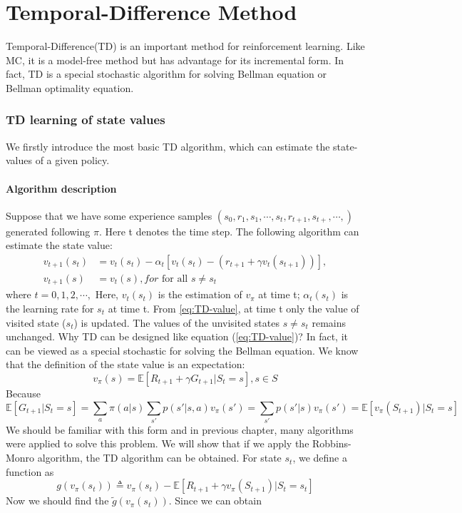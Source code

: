 \part{Temporal-Difference Method} Temporal-Difference(TD) is an important method for reinforcement learning. Like MC, it
is a model-free method but has advantage for its incremental form. In fact, TD is a special stochastic algorithm for
solving Bellman equation or Bellman optimality equation.

\section{TD learning of state values}
We firstly introduce the most basic TD algorithm, which can estimate the state-values of a given policy.
 \subsection{Algorithm description}
 Suppose that we have some experience samples $(s_{0},r_{1},s_{1},\cdots,s_{t},r_{t+1},s_{t+},\cdots,)$ generated following $\pi$. Here t denotes the time step. The following algorithm can 
estimate the state value:
\begin{align}\label{eq:TD-value}
  v_{t+1}(s_{t}) &= v_{t}(s_{t}) - \alpha_{t}\left[v_{t}(s_{t})-\left(r_{t+1}+\gamma v_{t}(s_{t+1})\right)\right], \\
  v_{t+1}(s) &= v_{t}(s), for \text{ for all }  s\neq s_{t}
\end{align}
where $t=0,1,2,\cdots,$ Here, $v_{t}(s_{t})$ is the estimation of $v_{\pi}$ at time t; $\alpha_{t}(s_{t})$ is the learning rate for $s_{t}$ at time t.
From \ref{eq:TD-value}, at time t only the value of visited state ($s_{t}$) is updated. The values of the unvisited states $s\neq s_{t}$ remains unchanged.
Why TD can be designed like equation (\ref{eq:TD-value})? In fact, it can be viewed as a special stochastic for solving the Bellman equation. We know that the definition of the state value is an expectation:
\begin{equation*}
    v_{\pi}(s) = \mathbb{E}\left[R_{t+1}+\gamma G_{t+1}|S_{t}=s\right], s\in S
\end{equation*}
Because
\begin{equation*}
    \mathbb{E}\left[G_{t+1}|S_{t}=s\right] = \sum_{a} \pi(a|s)\sum_{s'}p(s'|s,a)v_{\pi}(s') = \sum_{s'}p(s'|s)v_{\pi}(s') = \mathbb{E}[v_{\pi}(S_{t+1})|S_{t}=s]
\end{equation*}
We should be familiar with this form and in previous chapter, many algorithms were applied to solve this problem. We will show that if we apply the Robbins-Monro algorithm, the TD algorithm can be obtained.
For state $s_{t}$, we define a function as 
\begin{equation*}
    g(v_{\pi}(s_{t})) \triangleq v_{\pi}(s_{t}) - \mathbb{E}[R_{t+1}+\gamma v_{\pi}(S_{t+1})|S_{t}=s_{t}]
\end{equation*}
Now we should find the $\tilde{g}(v_{\pi}(s_{t}))$. Since we can obtain
